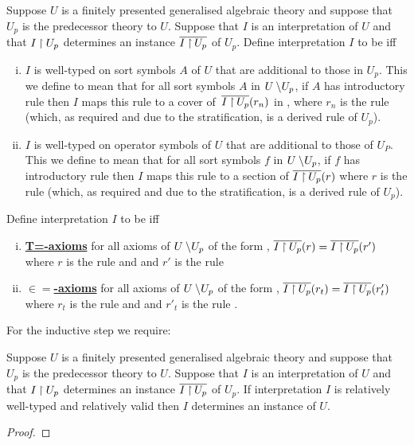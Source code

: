 \begin{definition}
Suppose $U$ is a finitely presented generalised algebraic theory and 
suppose that $U_p$ is the predecessor theory to $U$. Suppose that $I$ is an interpretation of $U$  and that  $I \mathbin{\restriction} U_p$  
determines an instance $\overline{I \mathbin{\restriction} U_p}$ of $U_p$.
Define interpretation $I$ to be   iff 

\begin{enumerate}[(i)]
\item
$I$ is well-typed on sort symbols $A$ of $U$ that are additional to those in $U_p$. This we define to mean that
for all sort symbols $A$ in $U \setminus\kern-2pt U_p$, if $A$ has introductory rule 
\genericAintroductoryrule then $I$ maps this rule to a cover of \,$\overline{I \mathbin{\restriction} U_p}(r_n)$ in \catc, where $r_n$ is the rule 
 (which, as required and due to the stratification, is a derived rule of $U_p$).
\item  $I$ is well-typed on operator symbols  of $U$ that are additional to those of $U_P$. This we define to mean that
for all sort symbols $f$ in $U \setminus\kern-2pt U_p$, if $f$ has introductory rule 
\genericfintroductoryrule then $I$ maps this rule to a section 
of $\overline{I \mathbin{\restriction} U_p}(r)$ where $r$ is the rule
 (which, as required and due to the stratification, is a derived rule of $U_p$). 
\end{enumerate}

Define interpretation $I$ to be   iff  
\begin{enumerate}[(i)]
\item \underline{\textbf{T=-axioms}} 
for all axioms of $U \setminus\kern-2pt U_p$ of the form
 ,
$\overline{I \mathbin{\restriction} U_p}(r) = \overline{I \mathbin{\restriction} U_p}(r')$ where $r$ is the rule
 and  
and $r'$ is the rule 
\item \underline{\textbf{$\boldsymbol{\in=}$-axioms}} 
for all axioms of $U \setminus\kern-2pt U_p$ of the form
,
$\overline{I \mathbin{\restriction} U_p}(r_t) = \overline{I \mathbin{\restriction} U_p}(r'_t)$ where $r_t$ is the rule
 and  
and $r'_t$ is the rule .
\end{enumerate}
\end{definition}

For the inductive step we require:
\begin{lemma}
Suppose $U$ is a finitely presented generalised algebraic theory and 
suppose that $U_p$ is the predecessor theory to $U$. Suppose that $I$ is an interpretation of $U$  and that  $I \mathbin{\restriction} U_p$  
determines an instance $\overline{I \mathbin{\restriction} U_p}$ of $U_p$.
If interpretation $I$ is relatively well-typed and relatively valid then $I$ determines an instance of $U$.
\end{lemma}
\begin{proof} 
\tbd
\end{proof}

